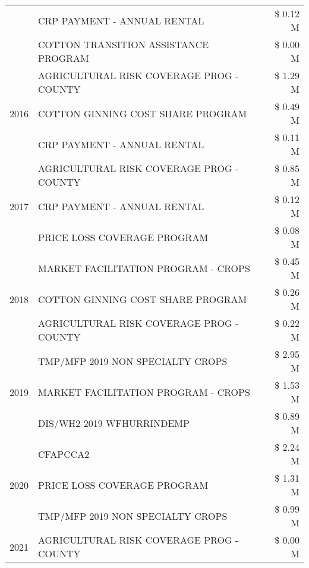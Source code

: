 \begin{tabular}{llr}
 & CRP PAYMENT - ANNUAL RENTAL & \$ 0.12 M \\
 & COTTON TRANSITION ASSISTANCE PROGRAM & \$ 0.00 M \\
\cline{1-3}
\multirow[t]{3}{*}{2016} & AGRICULTURAL RISK COVERAGE PROG - COUNTY & \$ 1.29 M \\
 & COTTON GINNING COST SHARE PROGRAM & \$ 0.49 M \\
 & CRP PAYMENT - ANNUAL RENTAL & \$ 0.11 M \\
\cline{1-3}
\multirow[t]{3}{*}{2017} & AGRICULTURAL RISK COVERAGE PROG - COUNTY & \$ 0.85 M \\
 & CRP PAYMENT - ANNUAL RENTAL & \$ 0.12 M \\
 & PRICE LOSS COVERAGE PROGRAM & \$ 0.08 M \\
\cline{1-3}
\multirow[t]{3}{*}{2018} & MARKET FACILITATION PROGRAM - CROPS & \$ 0.45 M \\
 & COTTON GINNING COST SHARE PROGRAM & \$ 0.26 M \\
 & AGRICULTURAL RISK COVERAGE PROG - COUNTY & \$ 0.22 M \\
\cline{1-3}
\multirow[t]{3}{*}{2019} & TMP/MFP 2019 NON SPECIALTY CROPS & \$ 2.95 M \\
 & MARKET FACILITATION PROGRAM - CROPS & \$ 1.53 M \\
 & DIS/WH2 2019 WFHURRINDEMP & \$ 0.89 M \\
\cline{1-3}
\multirow[t]{3}{*}{2020} & CFAPCCA2 & \$ 2.24 M \\
 & PRICE LOSS COVERAGE PROGRAM & \$ 1.31 M \\
 & TMP/MFP 2019 NON SPECIALTY CROPS & \$ 0.99 M \\
\cline{1-3}
2021 & AGRICULTURAL RISK COVERAGE PROG - COUNTY & \$ 0.00 M \\
\cline{1-3}
\bottomrule
\end{tabular}
